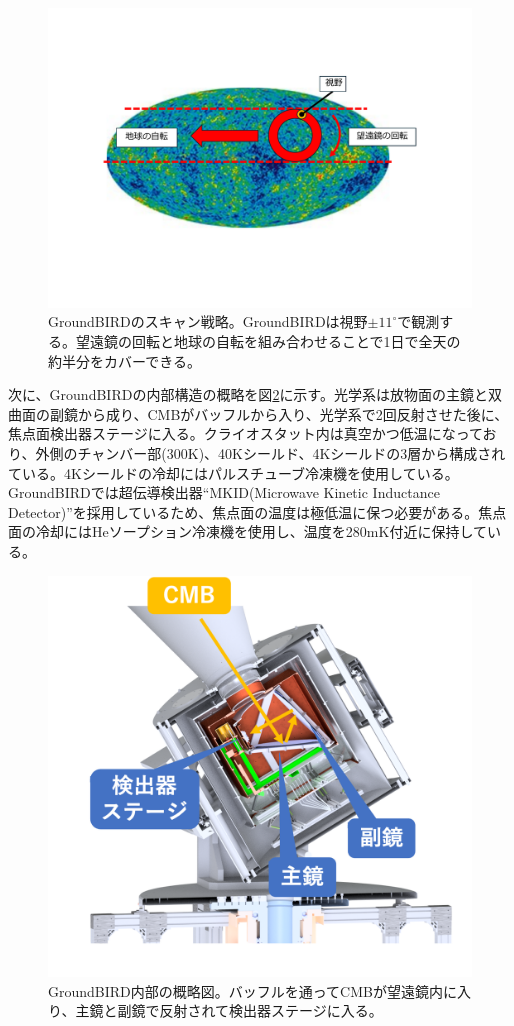 \begin{figure}[htbp]
  \centering
  \includegraphics[width=0.8\columnwidth]{3_GB/figs/scan_strategy.pdf}
  \caption{GroundBIRDのスキャン戦略。GroundBIRDは視野$\pm 11^{\circ}$で観測する。望遠鏡の回転と地球の自転を組み合わせることで1日で全天の約半分をカバーできる。}
  \label{scan_strategy}
\end{figure}

次に、GroundBIRDの内部構造の概略を図\ref{GB_inside}に示す。光学系は放物面の主鏡と双曲面の副鏡から成り、CMBがバッフルから入り、光学系で2回反射させた後に、焦点面検出器ステージに入る。クライオスタット内は真空かつ低温になっており、外側のチャンバー部(300K)、40Kシールド、4Kシールドの3層から構成されている。4Kシールドの冷却にはパルスチューブ冷凍機を使用している。GroundBIRDでは超伝導検出器``MKID(Microwave Kinetic Inductance Detector)''を採用しているため、焦点面の温度は極低温に保つ必要がある。焦点面の冷却にはHeソープション冷凍機を使用し、温度を280mK付近に保持している。

\begin{figure}[htbp]
  \centering
  \includegraphics[width=0.6\columnwidth]{3_GB/figs/gb_int.png}
  \caption{GroundBIRD内部の概略図。バッフルを通ってCMBが望遠鏡内に入り、主鏡と副鏡で反射されて検出器ステージに入る。}
  \label{GB_inside}
\end{figure}

